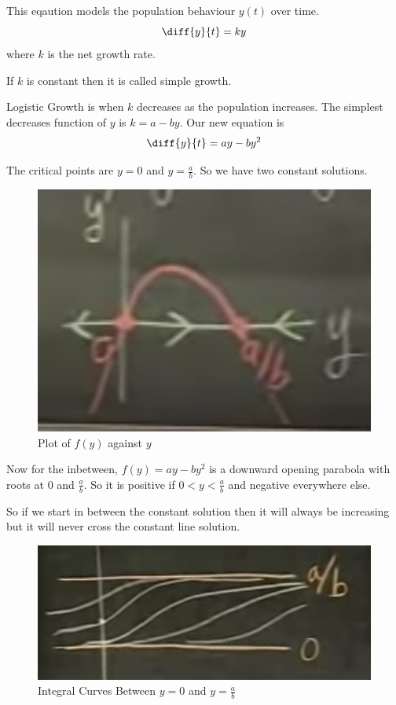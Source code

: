 This eqaution models the population behaviour $y(t)$ over time.
$$ \diff{y}{t} = ky $$
where $k$ is the net growth rate.

If $k$ is constant then it is called simple growth.

Logistic Growth is when $k$ decreases as the population increases.
The simplest decreases function of $y$ is $k = a - by$.
Our new equation is
$$ \diff{y}{t} = ay - by^2 $$

The critical points are $y = 0$ and $y = \frac{a}{b}$.
So we have two constant solutions.

\begin{figure}[ht!]
	\centering
	\includegraphics[scale=0.6]{./images/lecture_5_figure_2.png}
	\caption{Plot of $f(y)$ against $y$}
\end{figure}

Now for the inbetween, $f(y) = ay - by^2$ is a downward opening parabola with roots at $0$ and $\frac{a}{b}$.
So it is positive if $0 < y < \frac{a}{b}$ and negative everywhere else.

So if we start in between the constant solution then it will always be increasing but it will never cross the constant line solution.

\begin{figure}[ht!]
	\centering
	\includegraphics[scale=0.5]{./images/lecture_5_figure_3.png}
	\caption{Integral Curves Between $y = 0$ and $y = \frac{a}{b}$}
\end{figure}

